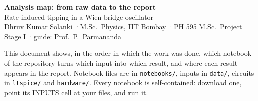 \documentclass[11pt]{article}
\begin{document}
\begin{center}
{\LARGE\bfseries Analysis map: from raw data to the report}\\[4pt]
{\large Rate-induced tipping in a Wien-bridge oscillator}\\[2pt]
Dhruv Kumar Solanki \quad·\quad M.Sc.\ Physics, IIT Bombay \quad·\quad PH 595 M.Sc.\ Project Stage I \quad·\quad guide: Prof.\ P.\ Parmananda
\end{center}

\noindent This document shows, in the order in which the work was done, which notebook of the repository turns which input into which
result, and where each result appears in the report. Notebook files are in \texttt{notebooks/}, inputs in \texttt{data/}, circuits in
\texttt{ltspice/} and \texttt{hardware/}. Every notebook is self-contained: download one, point its INPUTS cell at your files, and run it.

\medskip
\noindent{}
\end{document}
